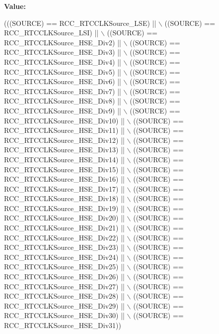 {\bfseries Value\+:}
\begin{DoxyCode}
(((SOURCE) == RCC_RTCCLKSource_LSE) || \(\backslash\)
                                      ((SOURCE) == RCC_RTCCLKSource_LSI) || \(\backslash\)
                                      ((SOURCE) == RCC_RTCCLKSource_HSE_Div2) || \(\backslash\)
                                      ((SOURCE) == RCC_RTCCLKSource_HSE_Div3) || \(\backslash\)
                                      ((SOURCE) == RCC_RTCCLKSource_HSE_Div4) || \(\backslash\)
                                      ((SOURCE) == RCC_RTCCLKSource_HSE_Div5) || \(\backslash\)
                                      ((SOURCE) == RCC_RTCCLKSource_HSE_Div6) || \(\backslash\)
                                      ((SOURCE) == RCC_RTCCLKSource_HSE_Div7) || \(\backslash\)
                                      ((SOURCE) == RCC_RTCCLKSource_HSE_Div8) || \(\backslash\)
                                      ((SOURCE) == RCC_RTCCLKSource_HSE_Div9) || \(\backslash\)
                                      ((SOURCE) == RCC_RTCCLKSource_HSE_Div10) || \(\backslash\)
                                      ((SOURCE) == RCC_RTCCLKSource_HSE_Div11) || \(\backslash\)
                                      ((SOURCE) == RCC_RTCCLKSource_HSE_Div12) || \(\backslash\)
                                      ((SOURCE) == RCC_RTCCLKSource_HSE_Div13) || \(\backslash\)
                                      ((SOURCE) == RCC_RTCCLKSource_HSE_Div14) || \(\backslash\)
                                      ((SOURCE) == RCC_RTCCLKSource_HSE_Div15) || \(\backslash\)
                                      ((SOURCE) == RCC_RTCCLKSource_HSE_Div16) || \(\backslash\)
                                      ((SOURCE) == RCC_RTCCLKSource_HSE_Div17) || \(\backslash\)
                                      ((SOURCE) == RCC_RTCCLKSource_HSE_Div18) || \(\backslash\)
                                      ((SOURCE) == RCC_RTCCLKSource_HSE_Div19) || \(\backslash\)
                                      ((SOURCE) == RCC_RTCCLKSource_HSE_Div20) || \(\backslash\)
                                      ((SOURCE) == RCC_RTCCLKSource_HSE_Div21) || \(\backslash\)
                                      ((SOURCE) == RCC_RTCCLKSource_HSE_Div22) || \(\backslash\)
                                      ((SOURCE) == RCC_RTCCLKSource_HSE_Div23) || \(\backslash\)
                                      ((SOURCE) == RCC_RTCCLKSource_HSE_Div24) || \(\backslash\)
                                      ((SOURCE) == RCC_RTCCLKSource_HSE_Div25) || \(\backslash\)
                                      ((SOURCE) == RCC_RTCCLKSource_HSE_Div26) || \(\backslash\)
                                      ((SOURCE) == RCC_RTCCLKSource_HSE_Div27) || \(\backslash\)
                                      ((SOURCE) == RCC_RTCCLKSource_HSE_Div28) || \(\backslash\)
                                      ((SOURCE) == RCC_RTCCLKSource_HSE_Div29) || \(\backslash\)
                                      ((SOURCE) == RCC_RTCCLKSource_HSE_Div30) || \(\backslash\)
                                      ((SOURCE) == RCC_RTCCLKSource_HSE_Div31))
\end{DoxyCode}


